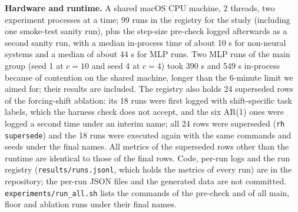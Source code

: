 \textbf{Hardware and runtime.} A shared macOS CPU machine, 2 threads, two experiment processes at a time; 99 runs in the registry for the study (including one smoke-test sanity run), plus the step-size pre-check logged afterwards as a second sanity run, with a median in-process time of about 10 s for non-neural systems and a median of about 44 s for MLP runs. Two MLP runs of the main group (seed 1 at $c{=}10$ and seed 4 at $c{=}4$) took 390 s and 549 s in-process because of contention on the shared machine, longer than the 6-minute limit we aimed for; their results are included. The registry also holds 24 superseded rows of the forcing-shift ablation: its 18 runs were first logged with shift-specific task labels, which the harness check does not accept, and the six AR(1) ones were logged a second time under an interim name; all 24 rows were superseded (\texttt{rh supersede}) and the 18 runs were executed again with the same commands and seeds under the final names. All metrics of the superseded rows other than the runtime are identical to those of the final rows. Code, per-run logs and the run registry (\texttt{results/runs.jsonl}, which holds the metrics of every run) are in the repository; the per-run JSON files and the generated data are not committed. \texttt{experiments/run\_all.sh} lists the commands of the pre-check and of all main, floor and ablation runs under their final names.
